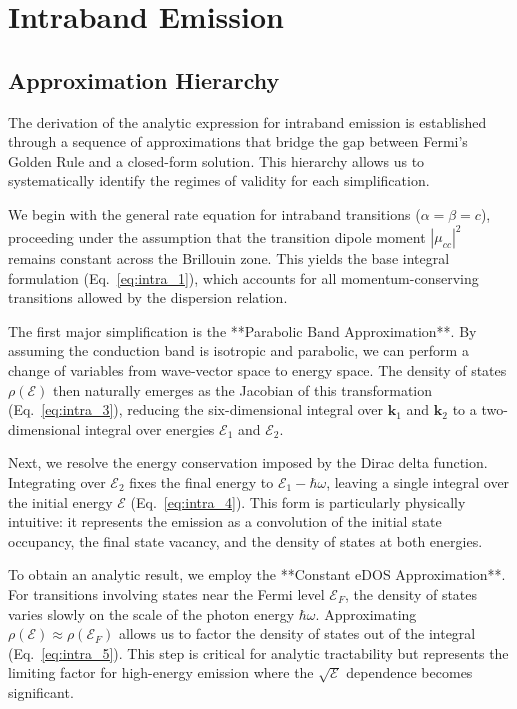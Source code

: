 \section{Intraband Emission}

\subsection{Approximation Hierarchy}
The derivation of the analytic expression for intraband emission is established through a sequence of approximations that bridge the gap between Fermi's Golden Rule and a closed-form solution. This hierarchy allows us to systematically identify the regimes of validity for each simplification.

We begin with the general rate equation for intraband transitions ($\alpha=\beta=c$), proceeding under the assumption that the transition dipole moment $|\mu_{cc}|^2$ remains constant across the Brillouin zone. This yields the base integral formulation (Eq.~\ref{eq:intra_1}), which accounts for all momentum-conserving transitions allowed by the dispersion relation.

The first major simplification is the **Parabolic Band Approximation**. By assuming the conduction band is isotropic and parabolic, we can perform a change of variables from wave-vector space to energy space. The density of states $\rho(\mathcal{E})$ then naturally emerges as the Jacobian of this transformation (Eq.~\ref{eq:intra_3}), reducing the six-dimensional integral over $\mathbf{k}_1$ and $\mathbf{k}_2$ to a two-dimensional integral over energies $\mathcal{E}_1$ and $\mathcal{E}_2$.

Next, we resolve the energy conservation imposed by the Dirac delta function. Integrating over $\mathcal{E}_2$ fixes the final energy to $\mathcal{E}_1 - \hbar\omega$, leaving a single integral over the initial energy $\mathcal{E}$ (Eq.~\ref{eq:intra_4}). This form is particularly physically intuitive: it represents the emission as a convolution of the initial state occupancy, the final state vacancy, and the density of states at both energies.

To obtain an analytic result, we employ the **Constant eDOS Approximation**. For transitions involving states near the Fermi level $\mathcal{E}_F$, the density of states varies slowly on the scale of the photon energy $\hbar\omega$. Approximating $\rho(\mathcal{E}) \approx \rho(\mathcal{E}_F)$ allows us to factor the density of states out of the integral (Eq.~\ref{eq:intra_5}). This step is critical for analytic tractability but represents the limiting factor for high-energy emission where the $\sqrt{\mathcal{E}}$ dependence becomes significant.

